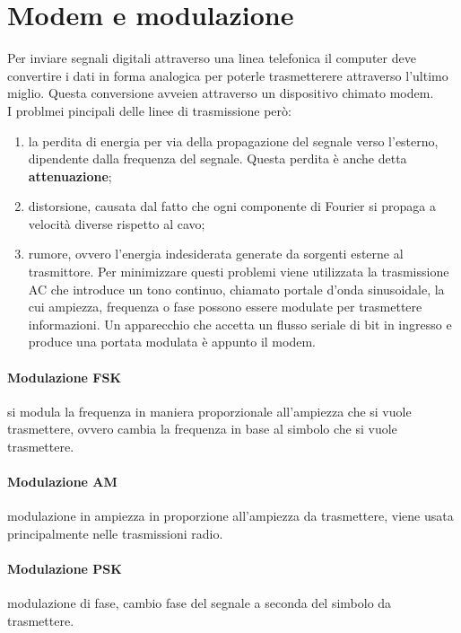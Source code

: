 \documentclass{article}
\begin{document}
\section{Modem e modulazione}

Per inviare segnali digitali attraverso una linea telefonica il computer deve
convertire i dati in forma analogica per poterle trasmetterere attraverso
l'ultimo miglio. Questa conversione avveien attraverso un dispositivo chimato
modem.\\
I problmei pincipali delle linee di trasmissione però:
\begin{enumerate}
	\item la perdita di energia per via della propagazione del segnale verso
		l'esterno, dipendente dalla frequenza del segnale. Questa perdita è
		anche detta \textbf{attenuazione};

	\item distorsione, causata dal fatto che ogni componente di Fourier si
		propaga a velocità diverse rispetto al cavo;

	\item rumore, ovvero l'energia indesiderata generate da sorgenti esterne al
		trasmittore. Per minimizzare questi problemi viene utilizzata la
		trasmissione AC che introduce un tono continuo, chiamato portale d'onda
		sinusoidale, la cui ampiezza, frequenza o fase possono essere modulate
		per trasmettere informazioni. Un apparecchio che accetta un flusso
		seriale di bit in ingresso e produce una portata modulata è appunto il
		modem. 
\end{enumerate}

\paragraph{Modulazione FSK} si modula la frequenza in maniera proporzionale
all'ampiezza che si vuole trasmettere, ovvero cambia la frequenza in base al
simbolo che si vuole trasmettere.

\paragraph{Modulazione AM} modulazione in ampiezza in proporzione all'ampiezza
da trasmettere, viene usata principalmente nelle trasmissioni radio. 

\paragraph{Modulazione PSK} modulazione di fase, cambio fase del segnale a
seconda del simbolo da trasmettere.
\end{document}
